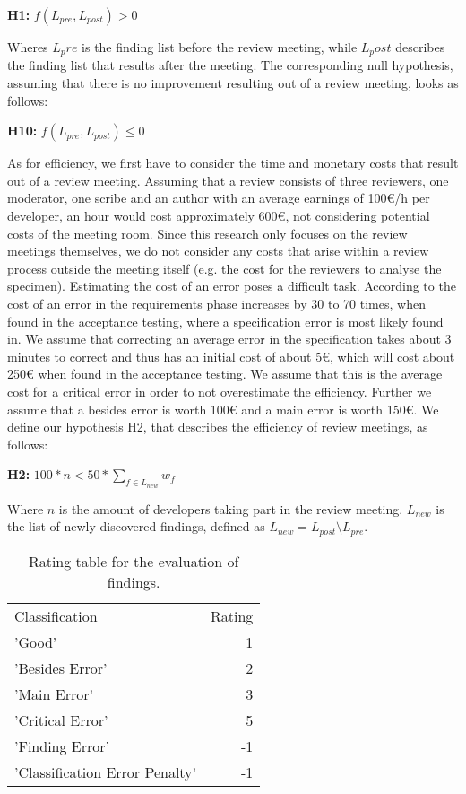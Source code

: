 \begin{center}
\textbf{H1:} $f(L_{pre}, L_{post}) > 0$
\end{center}

Wheres $L_pre$ is the finding list before the review meeting, while $L_post$ describes the finding list that results after the meeting.
The corresponding null hypothesis, assuming that there is no improvement resulting out of a review meeting, looks as follows:

\begin{center}
\textbf{H10:} $f(L_{pre}, L_{post}) \le 0$
\end{center}

As for efficiency, we first have to consider the time and monetary costs that result out of a review meeting. Assuming that a review consists of three reviewers, one moderator, one scribe and an author with an average earnings of 100€/h per developer, an hour would cost approximately 600€, not considering potential costs of the meeting room. Since this research only focuses on the review meetings themselves, we do not consider any costs that arise within a review process outside the meeting itself (e.g. the cost for the reviewers to analyse the specimen). Estimating the cost of an error poses a difficult task. According to \cite{stecklein2004error} the cost of an error in the requirements phase increases by 30 to 70 times, when found in the acceptance testing, where a specification error is most likely found in. We assume that correcting an average error in the specification takes about 3 minutes to correct and thus has an initial cost of about 5€, which will cost about 250€ when found in the acceptance testing.
We assume that this is the average cost for a critical error in order to not overestimate the efficiency. Further we assume that a besides error is worth 100€ and a main error is worth 150€. We define our hypothesis H2, that describes the efficiency of review meetings, as follows:

\begin{center}
\textbf{H2:} $100 * n < 50* \sum_{f \in L_{new}} w_f$
\end{center}

Where $n$ is the amount of developers taking part in the review meeting. $L_{new}$ is the list of newly discovered findings, defined as $L_{new} = L_{post} \setminus L_{pre}$.

\begin{table}
\centering
\begin{tabular}{lr}
  \rowcolor{heading}Classification & Rating \\
  \rowcolor{a}'Good' & 1 \\
  \rowcolor{b}'Besides Error' & 2 \\
  \rowcolor{a}'Main Error' & 3 \\
  \rowcolor{b}'Critical Error' & 5 \\
  \rowcolor{a}'Finding Error' & -1 \\
  \rowcolor{b}'Classification Error Penalty' & -1 \\
\end{tabular}
\caption{Rating table for the evaluation of findings.}
\label{tab:ratings}
\end{table}


